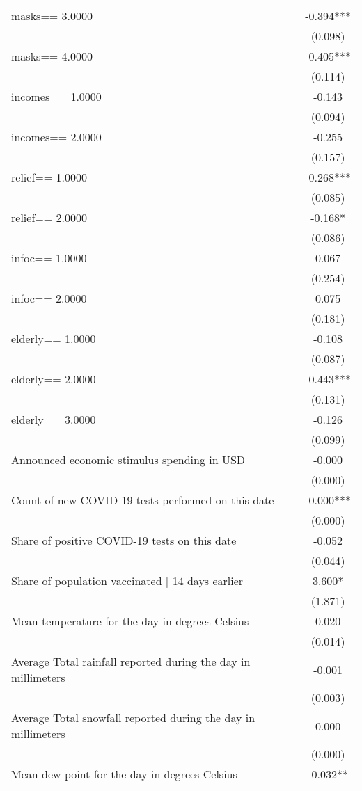 \begin{tabular}{lc}
masks==     3.0000 & -0.394*** \\
 & (0.098) \\
masks==     4.0000 & -0.405*** \\
 & (0.114) \\
incomes==     1.0000 & -0.143 \\
 & (0.094) \\
incomes==     2.0000 & -0.255 \\
 & (0.157) \\
relief==     1.0000 & -0.268*** \\
 & (0.085) \\
relief==     2.0000 & -0.168* \\
 & (0.086) \\
infoc==     1.0000 & 0.067 \\
 & (0.254) \\
infoc==     2.0000 & 0.075 \\
 & (0.181) \\
elderly==     1.0000 & -0.108 \\
 & (0.087) \\
elderly==     2.0000 & -0.443*** \\
 & (0.131) \\
elderly==     3.0000 & -0.126 \\
 & (0.099) \\
Announced economic stimulus spending in USD & -0.000 \\
 & (0.000) \\
Count of new COVID-19 tests performed on this date & -0.000*** \\
 & (0.000) \\
Share of positive COVID-19 tests on this date & -0.052 \\
 & (0.044) \\
Share of population vaccinated | 14 days earlier & 3.600* \\
 & (1.871) \\
Mean temperature for the day in degrees Celsius & 0.020 \\
 & (0.014) \\
Average Total rainfall reported during the day in millimeters & -0.001 \\
 & (0.003) \\
Average Total snowfall reported during the day in millimeters & 0.000 \\
 & (0.000) \\
Mean dew point for the day in degrees Celsius & -0.032** \\

\end{tabular}
